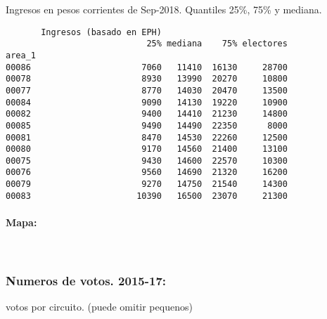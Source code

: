\documentclass[11pt]{article}
\begin{document}
    
    Ingresos en pesos corrientes de Sep-2018. Quantiles 25\%, 75\% y
mediana.

    
    
    \begin{verbatim}
       Ingresos (basado en EPH)                         
                            25% mediana    75% electores
area_1                                                  
00086                      7060   11410  16130     28700
00078                      8930   13990  20270     10800
00077                      8770   14030  20470     13500
00084                      9090   14130  19220     10900
00082                      9400   14410  21230     14800
00085                      9490   14490  22350      8000
00081                      8470   14530  22260     12500
00080                      9170   14560  21400     13100
00075                      9430   14600  22570     10300
00076                      9560   14690  21320     16200
00079                      9270   14750  21540     14300
00083                     10390   16500  23070     21300
    \end{verbatim}

    
    \hypertarget{mapa}{%
\paragraph{Mapa:}\label{mapa}}

    
    \begin{center}
    \end{center}
    { \hspace*{\fill} \\}
    
    \hypertarget{numeros-de-votos.-2015-17}{%
\subsubsection{Numeros de votos.
2015-17:}\label{numeros-de-votos.-2015-17}}

    
    votos por circuito. (puede omitir pequenos)

    
    
\end{document}

